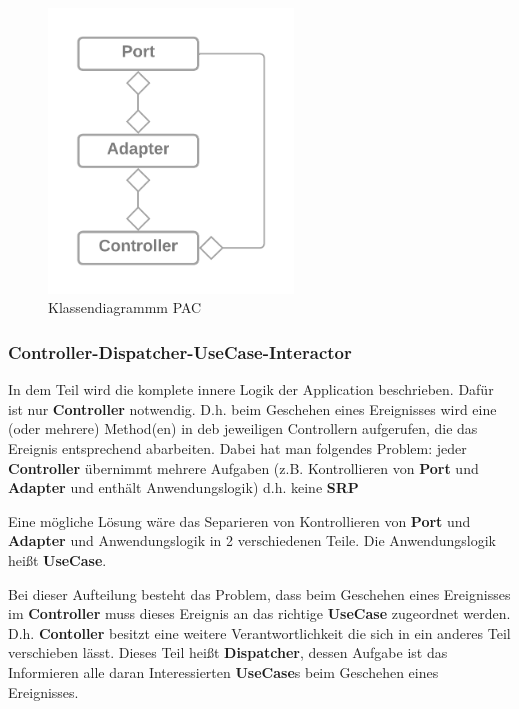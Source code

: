 \documentclass{article}
\begin{document}
    \begin{figure}[H]
       \centering
       \includegraphics[width=6.5cm]{./images/Port-Adapter-Contoller.png}
        \caption[Klassendiagrammm PAC]{Klassendiagrammm PAC \footnotemark}
        \label{fig:CDPAC}
    \end{figure}

    \subsubsection{Controller-Dispatcher-UseCase-Interactor} 
    \label{Controller-Dispatcher-UseCase-Interactor}
    In dem Teil wird die komplete innere Logik der Application beschrieben. Dafür ist nur \textbf{Controller} notwendig. 
    D.h. beim Geschehen eines Ereignisses wird eine (oder mehrere) Method(en) in deb jeweiligen Controllern aufgerufen,
    die das Ereignis entsprechend abarbeiten.
    Dabei hat man folgendes Problem:
    jeder \textbf{Controller} übernimmt mehrere Aufgaben 
    (z.B. Kontrollieren von \textbf{Port} und \textbf{Adapter} und enthält Anwendungslogik)
    d.h. keine \textbf{SRP}

    Eine mögliche Lösung wäre das Separieren von Kontrollieren von \textbf{Port} und \textbf{Adapter} und Anwendungslogik
    in 2 verschiedenen Teile. Die Anwendungslogik heißt \textbf{UseCase}.

    Bei dieser Aufteilung besteht das Problem, dass beim Geschehen eines Ereignisses im \textbf{Controller} muss dieses Ereignis an das 
    richtige \textbf{UseCase} zugeordnet werden. D.h. \textbf{Contoller} besitzt eine weitere Verantwortlichkeit die sich in ein anderes Teil
    verschieben lässt. Dieses Teil heißt \textbf{Dispatcher}, dessen Aufgabe ist das Informieren alle daran Interessierten \textbf{UseCase}s
    beim Geschehen eines Ereignisses. 
\end{document}
